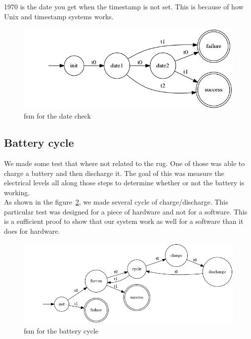 \documentclass[12pt]{article}
\theoremstyle{definition}
\theoremstyle{definition}
\theoremstyle{remark}
\begin{document}
1970 is the date you get when the timestamp is not set. This is because of how Unix and timestamp systems works.

\begin{figure}
    \centering
    \includegraphics[scale=0.6]{graph/DateCheck}
    \caption{\gls{fsm} for the date check}
    \label{datecheck}
\end{figure}


\subsection{Battery cycle}

We made some test that where not related to the \gls{rug}. One of those was able to charge a battery and then discharge it. The goal of this was measure the electrical levels all along those steps to determine whether or not the battery is working.\\

As shown in the figure~\ref{battcycle2}, we made several cycle of charge/discharge. This particular test was designed for a piece of hardware and not for a software. This is a sufficient proof to show that our system work as well for a software than it does for hardware.

\begin{figure}
    \centering
    \includegraphics[scale=0.4]{graph/BatteryCycle.png}
    \caption{\gls{fsm} for the battery cycle}
    \label{battcycle2}
\end{figure}

\clearpage
{}

{}

\clearpage
\printglossaries


\end{document}
